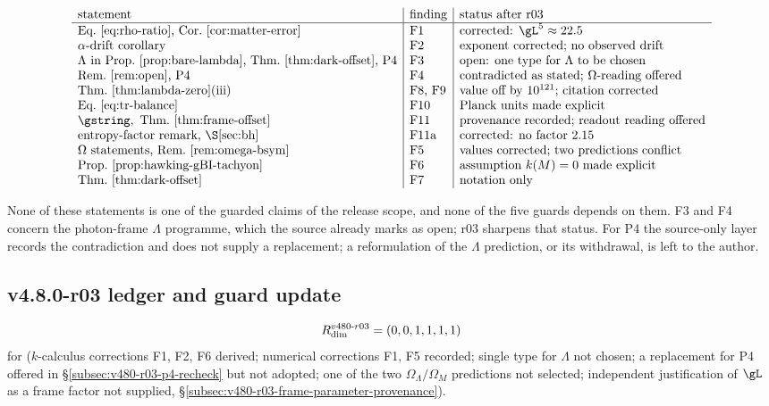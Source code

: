 \[
\begin{array}{l|l|l}
\text{statement} & \text{finding} & \text{status after r03}\\
\hline
\text{Eq.~\eqref{eq:rho-ratio}, Cor.~\ref{cor:matter-error}} & \text{F1} & \text{corrected: } \gL^5\approx22.5\\
\alpha\text{-drift corollary} & \text{F2} & \text{exponent corrected; no observed drift}\\
\Lambda\text{ in Prop.~\ref{prop:bare-lambda}, Thm.~\ref{thm:dark-offset}, P4} & \text{F3} & \text{open: one type for }\Lambda\text{ to be chosen}\\
\text{Rem.~\ref{rem:open}, P4} & \text{F4} & \text{contradicted as stated; }\Omega\text{-reading offered}\\
\text{Thm.~\ref{thm:lambda-zero}(iii)} & \text{F8, F9} & \text{value off by }10^{121}\text{; citation corrected}\\
\text{Eq.~\eqref{eq:tr-balance}} & \text{F10} & \text{Planck units made explicit}\\
\gstring,\ \text{Thm.~\ref{thm:frame-offset}} & \text{F11} & \text{provenance recorded; readout reading offered}\\
\text{entropy-factor remark, \S\ref{sec:bh}} & \text{F11a} & \text{corrected: no factor }2.15\\
\Omega\text{ statements, Rem.~\ref{rem:omega-bsym}} & \text{F5} & \text{values corrected; two predictions conflict}\\
\text{Prop.~\ref{prop:hawking-gBI-tachyon}} & \text{F6} & \text{assumption } k(M)=0 \text{ made explicit}\\
\text{Thm.~\ref{thm:dark-offset}} & \text{F7} & \text{notation only}
\end{array}
\]

None of these statements is one of the guarded claims of the release scope, and none of the
five guards depends on them.  F3 and F4 concern the photon-frame \(\Lambda\) programme, which the
source already marks as open; r03 sharpens that status.  For P4 the source-only layer records
the contradiction and does not supply a replacement; a reformulation of the
\(\Lambda\) prediction, or its withdrawal, is left to the author.

\subsection*{v4.8.0-r03 ledger and guard update}
\label{subsec:v480-r03-ledger-guard}

\[
R_{\rm dim}^{v480\text{-}r03}=(0,0,1,1,1,1)
\]
for (\(k\)-calculus corrections F1, F2, F6 derived; numerical corrections F1, F5 recorded; single
type for \(\Lambda\) not chosen; a replacement for P4 offered in \S\ref{subsec:v480-r03-p4-recheck} but not adopted; one of the two
\(\Omega_\Lambda/\Omega_M\) predictions not selected; independent justification of \(\gL\) as a frame factor not supplied, \S\ref{subsec:v480-r03-frame-parameter-provenance}).

